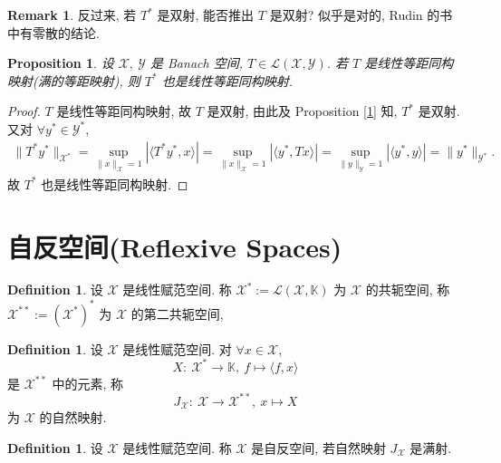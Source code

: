 \documentclass[a4paper,11pt]{article}
\newtheorem{proposition}[theorem]{Proposition}
\theoremstyle{definition}
\newtheorem{remark}[theorem]{Remark}
\newtheorem{definition}[theorem]{Definition}
\begin{document}
\begin{CJK*}{UTF8}{gbsn}
\begin{remark}
    反过来, 若 $ T^* $ 是双射, 能否推出 $ T $ 是双射? 似乎是对的, Rudin 的书中有零散的结论.
\end{remark}

\begin{proposition} \label{5}
    设 $ \mathcal{X},\ \mathcal{Y} $ 是 Banach 空间, $ T \in \mathscr{L}(\mathcal{X}, \mathcal{Y}) $. 
    若 $ T $ 是线性等距同构映射(满的等距映射), 则 $ T^* $ 也是线性等距同构映射.
\end{proposition}

\begin{proof}
     $ T $ 是线性等距同构映射, 故 $ T $ 是双射, 由此及 Proposition \ref{1} 知, $ T^* $ 是双射.
    又对 $ \forall y^* \in \mathcal{Y}^* $,
    \begin{align*}
        \| T^* y^* \|_{\mathcal{X}^*}
            = \sup_{\| x \|_\mathcal{X} = 1} |\langle T^* y^*, x \rangle|
            = \sup_{\| x \|_\mathcal{X} = 1} |\langle  y^*, T x \rangle|
            = \sup_{\| y \|_\mathcal{Y} = 1} |\langle  y^*, y \rangle|
            = \| y^* \|_{\mathcal{Y}^*}.
    \end{align*}
    故 $ T^* $ 也是线性等距同构映射.
\end{proof}

\section{自反空间(Reflexive Spaces)}

\begin{definition}
    设 $ \mathcal{X} $ 是线性赋范空间. 
    称 $ \mathcal{X}^* := \mathscr{L}(\mathcal{X}, \mathbb{K}) $ 为 $ \mathcal{X} $ 的共轭空间, 
    称 $ \mathcal{X}^{**} := (\mathcal{X}^*)^* $ 为 $ \mathcal{X} $ 的第二共轭空间, 
\end{definition}

\begin{definition}
    设 $ \mathcal{X} $ 是线性赋范空间. 
    对 $ \forall x \in \mathcal{X} $, 
    $$
        X :\ \mathcal{X}^* \to \mathbb{K} ,\ f \mapsto \langle f, x \rangle
    $$
    是 $ \mathcal{X}^{**} $ 中的元素, 称 
    $$
        J_\mathcal{X} :\ \mathcal{X} \to \mathcal{X}^{**} ,\ x \mapsto X
    $$ 
    为 $ \mathcal{X} $ 的自然映射.
\end{definition}

\begin{definition}
    设 $ \mathcal{X} $ 是线性赋范空间. 
    称 $ \mathcal{X} $ 是自反空间, 若自然映射 $ J_\mathcal{X} $ 是满射.
\end{definition}


\end{CJK*}
\end{document}
